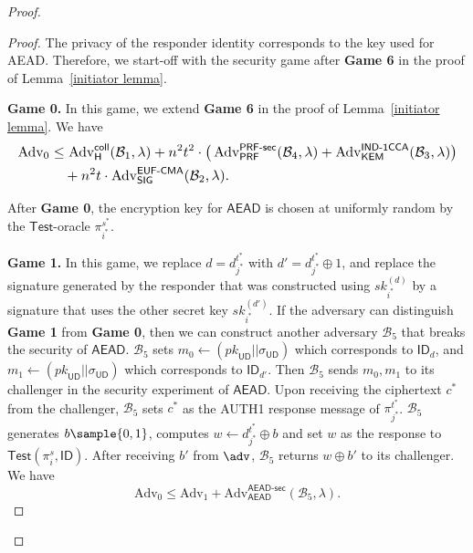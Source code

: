\documentclass[runningheads]{llncs}
\newcommand{\kem}{\mathsf{KEM}}
\begin{document}
\begin{proof}
\begin{proof}
    The privacy of the responder identity corresponds to the key used for AEAD.
    Therefore, we start-off with the security game after \textbf{Game 6} in the proof of Lemma~\ref{initiator lemma}.

    \smallskip\noindent\textbf{Game 0.}
    In this game, we extend \textbf{Game 6} in the proof of Lemma~\ref{initiator lemma}.
    We have
    \begin{equation*}
\resizebox{\linewidth}{!}{$\displaystyle
\begin{aligned}
\textrm{Adv}_{0}
&\leq \operatorname{Adv}_{\mathsf{H}}^{\mathsf{coll}}(\mathcal{B}_{1}, \lambda)
+ n^{2} t^{2}
\cdot \big( \operatorname{Adv}_{\mathsf{PRF}}^{\mathsf{PRF}\text{-}\mathsf{sec}}(\mathcal{B}_{4}, \lambda)
+ \operatorname{Adv}_{\kem}^{\mathsf{IND}\text{-}\mathsf{1CCA}}(\mathcal{B}_{3},\lambda)\big) \\
&\quad + n^{2} t \cdot \operatorname{Adv}_{\mathsf{SIG}}^{\mathsf{EUF}\text{-}\mathsf{CMA}}(\mathcal{B}_{2}, \lambda).
\end{aligned}$}
\end{equation*}

    After \textbf{Game 0}, the encryption key for $\mathsf{AEAD}$ is chosen at uniformly random by the $\mathsf{Test}$-oracle $\pi_{i^*}^{s^*}$.

    \smallskip\noindent\textbf{Game 1.}
    In this game, we replace $d = d_{j^*}^{t^*}$ with $d'=d_{j^*}^{t^*} \oplus 1$, and replace the signature generated by the responder that was constructed using ${sk}_{i^*}^{(d)}$ by a signature that uses the other secret key ${sk}_{i^*}^{(d')}$.
    If the adversary can distinguish \textbf{Game 1} from \textbf{Game 0}, then we can construct another adversary $\mathcal{B}_{5}$ that breaks the security of $\mathsf{AEAD}$.
    $\mathcal{B}_{5}$ sets $m_0 \gets ({pk}_{\mathsf{UD}} || \sigma_\mathsf{UD})$ which corresponds to $\mathsf{ID}_{d}$, and $m_1 \gets ({pk}_{\mathsf{UD}} || \sigma_\mathsf{UD})$ which corresponds to $\mathsf{ID}_{d'}$.
    Then $\mathcal{B}_{5}$ sends $m_0,m_1$ to its challenger in the security experiment of $\mathsf{AEAD}$.
    Upon receiving the ciphertext $c^*$ from the challenger, $\mathcal{B}_{5}$ sets $c^*$ as the \textsf{AUTH1 response} message of $\pi_{j^*}^{t^*}$.
    $\mathcal{B}_{5}$ generates $b\sample \{0,1\}$, computes $w\gets d_{j^*}^{t^*}\oplus b$ and set $w$ as the response to $\mathsf{Test}(\pi_i^s, \mathsf{ID})$.
    After receiving $b'$ from $\adv$, $\mathcal{B}_{5}$ returns $w\oplus b'$ to its challenger.
    We have
    $$
    \mathrm{Adv}_{0} \leq \mathrm{Adv}_{1} + \mathrm{Adv}_{\mathsf{AEAD}}^{\mathsf{AEAD}\text{-}\mathsf{sec}}(\mathcal{B}_{5},\lambda).
    $$


\end{proof}
\end{proof}
\end{document}
